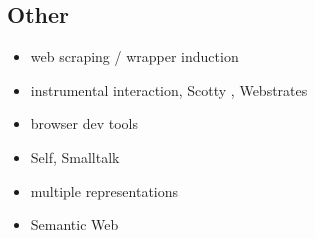 \documentclass[sigplan,10pt,anonymous,review]{acmart}
\providecommand{\tightlist}{%
  \setlength{\itemsep}{0pt}\setlength{\parskip}{0pt}}
\begin{document}
\hypertarget{other}{%
\subsection{Other}\label{other}}

\begin{itemize}
\tightlist
\item
  web scraping / wrapper induction
\item
  instrumental interaction, Scotty \citep{eagan2011}, Webstrates
\item
  browser dev tools
\item
  Self, Smalltalk
\item
  multiple representations
\item
  Semantic Web
\end{itemize}



\end{document}
